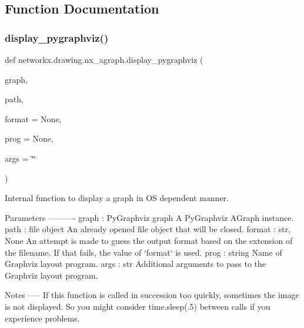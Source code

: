 \subsection{Function Documentation}
\mbox{\label{namespacenetworkx_1_1drawing_1_1nx__agraph_a96c4087e9d8bfdc5dd97915c37b0feb1}} 
\subsubsection{\texorpdfstring{display\+\_\+pygraphviz()}{display\_pygraphviz()}}
{\footnotesize\ttfamily def networkx.\+drawing.\+nx\+\_\+agraph.\+display\+\_\+pygraphviz (\begin{DoxyParamCaption}\item[{}]{graph,  }\item[{}]{path,  }\item[{}]{format = {\ttfamily None},  }\item[{}]{prog = {\ttfamily None},  }\item[{}]{args = {\ttfamily \char`\"{}\char`\"{}} }\end{DoxyParamCaption})}

\begin{DoxyVerb}Internal function to display a graph in OS dependent manner.

Parameters
----------
graph : PyGraphviz graph
    A PyGraphviz AGraph instance.
path :  file object
    An already opened file object that will be closed.
format : str, None
    An attempt is made to guess the output format based on the extension
    of the filename. If that fails, the value of `format` is used.
prog : string
    Name of Graphviz layout program.
args : str
    Additional arguments to pass to the Graphviz layout program.

Notes
-----
If this function is called in succession too quickly, sometimes the
image is not displayed. So you might consider time.sleep(.5) between
calls if you experience problems.\end{DoxyVerb}
 \mbox{\label{namespacenetworkx_1_1drawing_1_1nx__agraph_a594c52da2133757db464d2e5c5e5c0e1}} 
